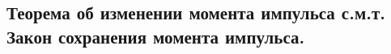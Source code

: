 \subsection{\textbf{Теорема об изменении момента импульса с.м.т.} Закон сохранения момента импульса.}